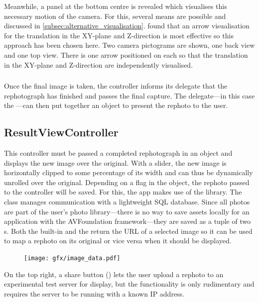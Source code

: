 Meanwhile, a panel at the bottom centre is revealed which visualises this
necessary motion of the camera. For this, several means are possible and
discussed in \autoref{subsec:alternative_visualisation}.
\citet{bae2010} found that an arrow visualisation for the translation in the
XY-plane and Z-direction is most effective so this approach has been chosen
here. Two camera pictograms are shown, one back view and one top view. There is
one arrow positioned on each so that the translation in the XY-plane and
Z-direction are independently visualised.


\subsubsection*{}

Once the final image is taken, the controller informs its delegate that the
rephotograph has finished and passes the final capture. The delegate---in this
case the ---can then put together an
 object to present the rephoto to the user.

\subsection{ResultViewController}


This controller must be passed a completed rephotograph in an 
object and displays the new image over the original.  With a slider, the new
image is horizontally clipped to some percentage of its width and can thus be
dynamically unrolled over the original. Depending on a flag in the
 object, the rephoto passed to the controller will be saved. For
this, the app makes use of the  library. The  class
manages communication with a lightweight SQL database. Since all photos are part
of the user's photo library---there is no way to save assets locally for an
application with the AVFoundation framework---they are saved as a tuple of two
s. Both the built-in  and the
 return the URL of a selected image so it can be
used to map a rephoto on its original or vice versa when it should be displayed.


\begin{figure}
   \texttt{[image: gfx/image\_data.pdf]}
\end{figure}
On the top right, a share button ()
lets the user upload a rephoto to an experimental test server for display, but the
functionality is only rudimentary and requires the server to be running with a known IP address.

